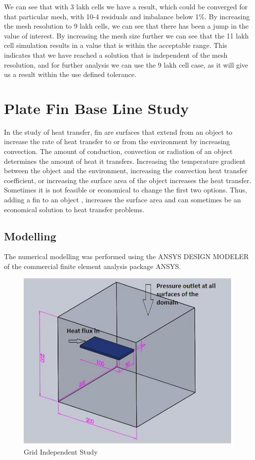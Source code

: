 We can see that with 3 lakh cells we have a result, which could be converged for that particular mesh, with 10-4 residuals and imbalance below 1\%. By increasing the mesh resolution to 9 lakh cells, we can see that there has been a jump in the value of interest.
By increasing the mesh size further we can see that the 11 lakh cell simulation results in a value that is within the acceptable range. This indicates that we have reached a solution that is independent of the mesh resolution, and for further analysis we can use the 9 lakh cell case, as it will give us a result within the use defined tolerance. 


\section{Plate Fin Base Line Study}

		In the study of heat transfer, fin are surfaces that extend from an object to increase the rate of heat transfer to or from the environment by increasing convection. The amount of conduction, convection or radiation of an object determines the amount of heat it transfers. Increasing the temperature gradient between the object and the environment, increasing the convection heat transfer coefficient, or increasing the surface area of the object increases the heat transfer. Sometimes it is not feasible or economical to change the first two options. Thus, adding a fin to an object , increases the surface area and can sometimes be an economical solution to heat transfer problems. 
		
\subsection{Modelling}

The numerical modelling was performed using the ANSYS DESIGN MODELER of the commercial finite element analysis package ANSYS. 


\begin{figure}[h]
	\label{ss}    %
	\centering
	\includegraphics[width= 10 cm]{104.jpg}
	\caption{ Grid Independent Study}
\end{figure}

